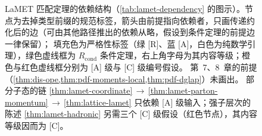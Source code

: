 \begin{figure}[htbp]
\caption{LaMET 匹配定理的依赖结构（\cref{tab:lamet-dependency} 的图示）。节点为去掉类型前缀的规范标签，箭头由前提指向依赖者，只画传递约化后的边（可由其他路径推出的依赖从略，假设到条件定理的前提边一律保留）；
填充色为严格性标签（绿 [R]、蓝 [A]，白色为纯数学引理），绿色虚线框为 $R_{\mathrm{cond}}$ 条件定理，右上角字母为其内容等级；橙色与红色虚线框分别为 [A] 级与 [C] 级编号假设。
第~7、8~章的前提（\cref{thm:dis-ope,thm:pdf-moments-local,thm:pdf-dglap}）未画出。
部分子态的链 \cref{thm:lamet-coordinate}$\,\to\,$\cref{thm:lamet-parton-momentum}$\,\to\,$\cref{thm:lattice-lamet} 只依赖 [A] 级输入；强子层次的陈述 \cref{thm:lamet-hadronic} 另需三个 [C] 级假设（红色节点），其内容等级因而为 [C]。}
\label{fig:lamet-dependency}
\end{figure}
